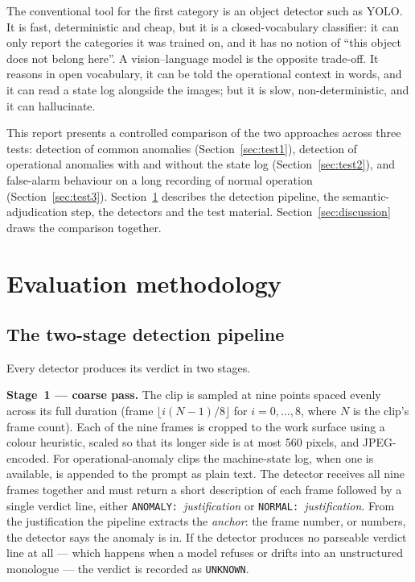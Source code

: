 \documentclass[11pt,a4paper]{article}
\begin{document}
The conventional tool for the first category is an object detector such as
YOLO. It is fast, deterministic and cheap, but it is a closed-vocabulary
classifier: it can only report the categories it was trained on, and it
has no notion of ``this object does not belong here''. A vision--language
model is the opposite trade-off. It reasons in open vocabulary, it can be
told the operational context in words, and it can read a state log
alongside the images; but it is slow, non-deterministic, and it can
hallucinate.

This report presents a controlled comparison of the two approaches across
three tests: detection of common anomalies (Section~\ref{sec:test1}),
detection of operational anomalies with and without the state log
(Section~\ref{sec:test2}), and false-alarm behaviour on a long recording
of normal operation (Section~\ref{sec:test3}). Section~\ref{sec:method}
describes the detection pipeline, the semantic-adjudication step, the
detectors and the test material. Section~\ref{sec:discussion} draws the
comparison together.

\section{Evaluation methodology}
\label{sec:method}

\subsection{The two-stage detection pipeline}

Every detector produces its verdict in two stages.

\textbf{Stage~1 --- coarse pass.} The clip is sampled at nine points
spaced evenly across its full duration (frame $\lfloor i(N-1)/8\rfloor$
for $i = 0,\dots,8$, where $N$ is the clip's frame count). Each of the
nine frames is cropped to the work surface using a colour heuristic,
scaled so that its longer side is at most 560 pixels, and JPEG-encoded.
For operational-anomaly clips the machine-state log, when one is
available, is appended to the prompt as plain text. The detector receives
all nine frames together and must return a short description of each frame
followed by a single verdict line, either
\texttt{ANOMALY:}~\emph{justification} or \texttt{NORMAL:}~\emph{justification}.
From the justification the pipeline extracts the \emph{anchor}: the frame
number, or numbers, the detector says the anomaly is in. If the detector
produces no parseable verdict line at all --- which happens when a model
refuses or drifts into an unstructured monologue --- the verdict is
recorded as \texttt{UNKNOWN}.
\end{document}
